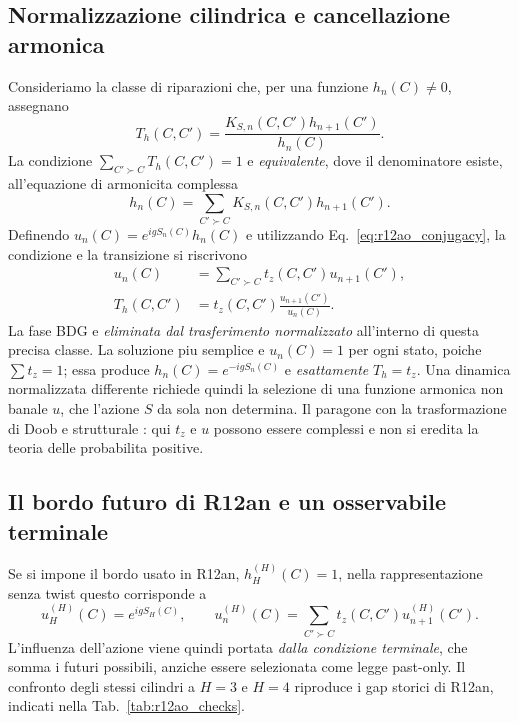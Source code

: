 \documentclass[11pt,a4paper]{article}
\begin{document}
\subsection{Normalizzazione cilindrica e cancellazione armonica}
Consideriamo la classe di riparazioni che, per una funzione $h_n(C)\ne0$, assegnano
\begin{equation}
 T_h(C,C')=\frac{K_{S,n}(C,C')h_{n+1}(C')}{h_n(C)}.
 \label{eq:r12ao_h_transform}
\end{equation}
La condizione $\sum_{C'\succ C}T_h(C,C')=1$ e \emph{equivalente}, dove il denominatore esiste, all'equazione di armonicita complessa
\begin{equation}
 h_n(C)=\sum_{C'\succ C}K_{S,n}(C,C')h_{n+1}(C').
 \label{eq:r12ao_harmonic}
\end{equation}
Definendo $u_n(C)=e^{igS_n(C)}h_n(C)$ e utilizzando Eq.~\eqref{eq:r12ao_conjugacy}, la condizione e la transizione si riscrivono
\begin{align}
 u_n(C)&=\sum_{C'\succ C}t_z(C,C')u_{n+1}(C'),\\
 \boxed{T_h(C,C')}&=t_z(C,C')\frac{u_{n+1}(C')}{u_n(C)}.
 \label{eq:r12ao_cancelled}
\end{align}
La fase BDG e \emph{eliminata dal trasferimento normalizzato} all'interno di questa precisa classe. La soluzione piu semplice e $u_n(C)=1$ per ogni stato, poiche $\sum t_z=1$; essa produce $h_n(C)=e^{-igS_n(C)}$ e \emph{esattamente} $T_h=t_z$. Una dinamica normalizzata differente richiede quindi la selezione di una funzione armonica non banale $u$, che l'azione $S$ da sola non determina. Il paragone con la trasformazione di Doob e strutturale \cite{Doob1957}: qui $t_z$ e $u$ possono essere complessi e non si eredita la teoria delle probabilita positive.

\subsection{Il bordo futuro di R12an e un osservabile terminale}
Se si impone il bordo usato in R12an, $h_H^{(H)}(C)=1$, nella rappresentazione senza twist questo corrisponde a
\begin{equation}
 u_H^{(H)}(C)=e^{igS_H(C)},\qquad
 u_n^{(H)}(C)=\sum_{C'\succ C}t_z(C,C')u_{n+1}^{(H)}(C').
 \label{eq:r12ao_terminal_observable}
\end{equation}
L'influenza dell'azione viene quindi portata \emph{dalla condizione terminale}, che somma i futuri possibili, anziche essere selezionata come legge past-only. Il confronto degli stessi cilindri a $H=3$ e $H=4$ riproduce i gap storici di R12an, indicati nella Tab.~\ref{tab:r12ao_checks}.
\end{document}
